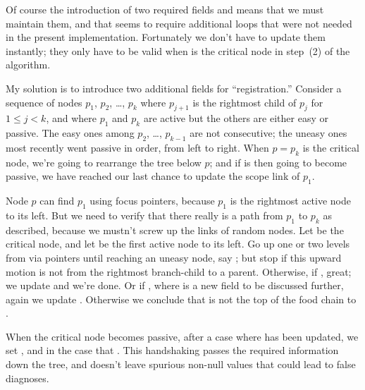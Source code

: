 Of course the introduction of two required fields  and
 means that we must maintain them, and that seems to
require
additional loops that were not needed in the present implementation.
Fortunately we don't have to update them instantly; they only have
to be valid when  is the critical node in step~(2) of the
algorithm.

My solution is to introduce two additional fields for ``registration.''
Consider a sequence of nodes $p_1$, $p_2$, \dots, $p_k$ where
$p_{j+1}$ is the rightmost child of $p_j$ for $1\le j<k$, and where
$p_1$ and $p_k$ are active but the others are either easy or passive.
The easy ones among $p_2$, \dots, $p_{k-1}$ are not consecutive;
the uneasy ones most recently went passive in order, from left to right.
When $p=p_k$
is the critical node, we're going to rearrange the tree below $p$;
and if  is then going to become passive, we have reached
our last chance to update the scope link of $p_1$.

Node $p$ can find $p_1$ using focus pointers,
because $p_1$ is the rightmost active node to its left.
But we need to verify that there really is a path from $p_1$ to $p_k$
as described, because we mustn't screw up the  links of random
nodes.
Let  be the critical node, and let  be the first active node to
its left.
Go up one or two levels from  via  pointers until
reaching
an uneasy node, say ; but stop if this upward motion is
not from the rightmost branch-child to a parent. Otherwise,
if , great; we update  and
we're done. Or if , where  is a
new field
to be discussed further, again we update . Otherwise we
conclude that  is not the top of the food chain to .

When the critical node  becomes passive, after a case where 
has been updated, we set , and  in the
case that . This handshaking passes the required
information
down the tree, and doesn't leave spurious non-null  values
that could lead to false diagnoses.

